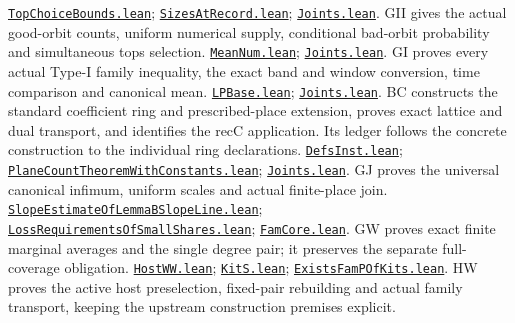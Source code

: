 \documentclass[11pt,a4paper]{article}
\numberwithin{equation}{section}
\theoremstyle{remark}\newtheorem{remark}[theorem]{Remark}
\newcommand{\src}[2]{\href{https://github.com/CocoSgt/riemann-hypothesis-lean/blob/7cbf7a0c32fca1badf05931879a37c3f8a2b03b4/src/#1}{\texttt{#2}}}
\begin{document}
\begin{thebibliography}{99}
 \src{Formalism/SharpRestriction/GrowthBounds/TopChoiceBounds.lean}{TopChoiceBounds.lean}; \src{Formalism/SharpRestriction/GrowthBounds/SizesAtRecord.lean}{SizesAtRecord.lean}; \src{Formalism/SharpRestriction/GrowthBounds/Joints.lean}{Joints.lean}. GII gives the actual good-orbit counts, uniform numerical supply, conditional bad-orbit probability and simultaneous tops selection.
 \src{Formalism/SharpRestriction/GrowthBounds/LogarithmicSums/MeanNum.lean}{MeanNum.lean}; \src{Formalism/SharpRestriction/GrowthBounds/Joints.lean}{Joints.lean}. GI proves every actual Type-I family inequality, the exact band and window conversion, time comparison and canonical mean.
 \src{Formalism/LocalToGlobal/GroupLattices/FockModels/LPBase.lean}{LPBase.lean}; \src{Formalism/SharpRestriction/GrowthBounds/Joints.lean}{Joints.lean}. BC constructs the standard coefficient ring and prescribed-place extension, proves exact lattice and dual transport, and identifies the recC application. Its ledger follows the concrete construction to the individual ring declarations.
 \src{Formalism/SharpRestriction/GrowthBounds/DefsInst.lean}{DefsInst.lean}; \src{Formalism/SharpRestriction/GrowthBounds/PlaneCountTheoremWithConstants.lean}{PlaneCountTheoremWithConstants.lean}; \src{Formalism/SharpRestriction/GrowthBounds/Joints.lean}{Joints.lean}. GJ proves the universal canonical infimum, uniform scales and actual finite-place join.
 \src{Formalism/SharpRestriction/GrowthBounds/LogarithmicSums/SlopeEstimateOfLemmaBSlopeLine.lean}{SlopeEstimateOfLemmaBSlopeLine.lean}; \src{Formalism/LocalToGlobal/GlobalTheory/LossRequirementsOfSmallShares.lean}{LossRequirementsOfSmallShares.lean}; \src{Formalism/SharpRestriction/FamCore.lean}{FamCore.lean}. GW proves exact finite marginal averages and the single degree pair; it preserves the separate full-coverage obligation.
 \src{Development/AutomorphicArithmetic/CharacterBoxes/HostWW.lean}{HostWW.lean}; \src{Development/AutomorphicArithmetic/CharacterBoxes/KitS.lean}{KitS.lean}; \src{Development/AbelianVarietyTheory/Proofs/GlobalInterpolation/ExistsFamPOfKits.lean}{ExistsFamPOfKits.lean}. HW proves the active host preselection, fixed-pair rebuilding and actual family transport, keeping the upstream construction premises explicit.

\end{thebibliography}
\end{document}
